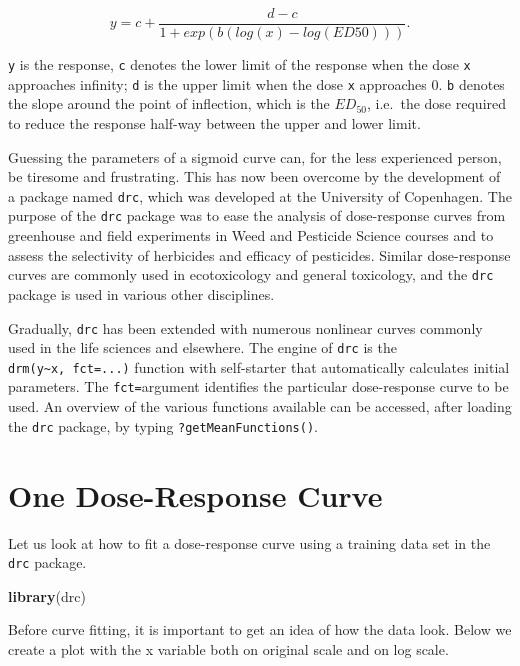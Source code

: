 \documentclass[letterpaper,]{book}
\newenvironment{Shaded}{\begin{snugshade}}{\end{snugshade}}
\newcommand{\KeywordTok}[1]{\textcolor[rgb]{0.13,0.29,0.53}{\textbf{#1}}}
\newcommand{\NormalTok}[1]{#1}
\begin{document}
\[y = c+\frac{d-c}{1+exp(b(log(x)-log(ED50)))} .\]

\texttt{y} is the response, \texttt{c} denotes the lower limit of the response when the dose \texttt{x} approaches infinity; \texttt{d} is the upper limit when the dose \texttt{x} approaches 0. \texttt{b} denotes the slope around the point of inflection, which is the \(ED_{50}\), i.e.~the dose required to reduce the response half-way between the upper and lower limit.

Guessing the parameters of a sigmoid curve can, for the less experienced person, be tiresome and frustrating. This has now been overcome by the development of a package named \texttt{drc}, which was developed at the University of Copenhagen. The purpose of the \texttt{drc} package was to ease the analysis of dose-response curves from greenhouse and field experiments in Weed and Pesticide Science courses and to assess the selectivity of herbicides and efficacy of pesticides. Similar dose-response curves are commonly used in ecotoxicology and general toxicology, and the \texttt{drc} package is used in various other disciplines.

Gradually, \texttt{drc} has been extended with numerous nonlinear curves commonly used in the life sciences and elsewhere. The engine of \texttt{drc} is the \texttt{drm(y\textasciitilde{}x,\ fct=...)} function with self-starter that automatically calculates initial parameters. The \texttt{fct=}argument identifies the particular dose-response curve to be used. An overview of the various functions available can be accessed, after loading the \texttt{drc} package, by typing \texttt{?getMeanFunctions()}.

\hypertarget{one-dose-response-curve}{%
\section{One Dose-Response Curve}\label{one-dose-response-curve}}

Let us look at how to fit a dose-response curve using a training data set in the \texttt{drc} package.

\begin{Shaded}
\begin{Highlighting}[]
\KeywordTok{library}\NormalTok{(drc)}
\end{Highlighting}
\end{Shaded}

Before curve fitting, it is important to get an idea of how the data look. Below we create a plot with the x variable both on original scale and on log scale.
\end{document}
